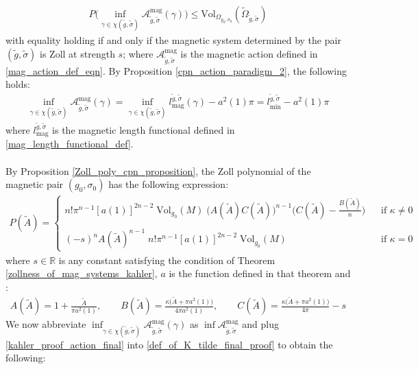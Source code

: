 \documentclass[11pt]{amsart}
\theoremstyle{plain}
\theoremstyle{definition}
\theoremstyle{remark}
\begin{document}
\begin{align}\label{mag_final_ineq_1}
    P\big(\inf_{\gamma \in \chi(\tilde g,\tilde \sigma)}\mathcal{A}^{\text{mag}}_{\tilde g,\tilde \sigma}(\gamma)\big) \leq \text{Vol}_{\Omega_{g_0,\sigma_0}}(\tilde \Omega_{\tilde g,\tilde \sigma})
\end{align}
with equality holding if and only if the magnetic system determined by the pair $(\tilde g,\tilde \sigma)$ is Zoll at strength $s$; where $\mathcal{A}^{\text{mag}}_{\tilde g,\tilde \sigma}$ is the magnetic action defined in \eqref{mag_action_def_eqn}. By Proposition \ref{cpn_action_paradigm_2}, the following holds:
\begin{align}\label{kahler_proof_action_final}
    \inf_{\gamma \in \chi(\tilde g,\tilde \sigma)}\mathcal{A}^{\text{mag}}_{\tilde g,\tilde \sigma}(\gamma) = \inf_{\gamma \in \chi(\tilde g,\tilde \sigma)} l_{\text{mag}}^{\tilde g,\tilde \sigma}(\gamma) - a^2(1)\pi  =l_{\text{min}}^{\tilde g,\tilde \sigma} - a^2(1)\pi
\end{align}
where $l_{\text{mag}}^{\tilde g,\tilde \sigma}$ is the magnetic length functional defined in \eqref{mag_length_functional_def}.\\
\\
By Proposition \ref{Zoll_poly_cpn_proposition}, the Zoll polynomial of the magnetic pair $(g_0,\sigma_0)$ has the following expression:
\begin{align}\label{zoll_poly_final_expression}
 P(\tilde A) = \begin{cases}
  n!\pi^{n-1}[a(1)]^{2n-2}
    \;\text{Vol}_{g_0}(M)\; \big(A(\tilde A)C(\tilde A)\big)^{n-1}\bigg(C(\tilde A) -\frac{B(\tilde A)}{n} \bigg) \;\;\;&\text{if $\kappa \neq 0$} 
    \\
    \\
       (-s)^n A(\tilde A)^{n-1}\; n!\pi^{n-1}[a(1)]^{2n-2}
    \;\text{Vol}_{g_0}(M)\;\;\; &\text{if $\kappa =0$}
 \end{cases}  
 \end{align}
 where $s \in \mathbb{R}$ is any constant satisfying the condition of Theorem \ref{zollness_of_mag_systems_kahler}, $a$ is the function defined in that theorem and :
 \begin{align}\label{def_of_K_tilde_final_proof}
   A(\tilde A)=1+\frac{\tilde A}{\pi a^2(1)},\qquad
B(\tilde A)=\frac{\kappa\bigl(\tilde A+\pi a^2(1)\bigr)}{4\pi a^2(1)},\qquad
C(\tilde A)=\frac{\kappa\bigl(\tilde A+\pi a^2(1)\bigr)}{4\pi}-s
 \end{align}
 We now abbreviate $\inf_{\gamma \in \chi(\tilde g,\tilde \sigma)}\mathcal{A}^{\text{mag}}_{\tilde g,\tilde \sigma}(\gamma)$ as $\inf \mathcal{A}^{\text{mag}}_{\tilde g,\tilde \sigma}$ and plug \eqref{kahler_proof_action_final} into \eqref{def_of_K_tilde_final_proof} to obtain the following:
\end{document}
